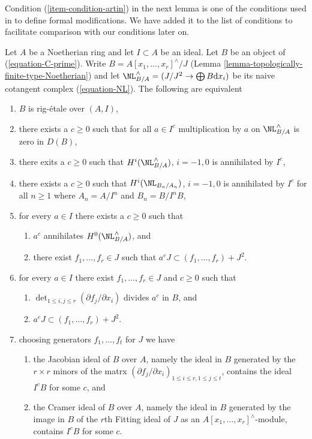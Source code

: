 \noindent
Condition (\ref{item-condition-artin}) in the next lemma is
one of the conditions used in \cite{ArtinII} to define formal modifications.
We have added it to the list of conditions to facilitate comparison
with our conditions later on.

\begin{lemma}
\label{lemma-equivalent-with-artin}
Let $A$ be a Noetherian ring and let $I \subset A$ be an ideal.
Let $B$ be an object of (\ref{equation-C-prime}). Write
$B = A[x_1, \ldots, x_r]^\wedge/J$
(Lemma \ref{lemma-topologically-finite-type-Noetherian})
and let $\NL_{B/A}^\wedge = (J/J^2 \to \bigoplus B\text{d}x_i)$
be its naive cotangent complex (\ref{equation-NL}).
The following are equivalent
\begin{enumerate}
\item $B$ is rig-\'etale over $(A, I)$,
\item
\label{item-zero-on-NL}
there exists a $c \geq 0$ such that for all $a \in I^c$ multiplication by $a$
on $\NL_{B/A}^\wedge$ is zero in $D(B)$,
\item
\label{item-zero-on-cohomology-NL}
there exits a $c \geq 0$ such that $H^i(\NL_{B/A}^\wedge)$, $i = -1, 0$ is
annihilated by $I^c$,
\item
\label{item-zero-on-cohomology-NL-truncations}
there exists a $c \geq 0$ such that $H^i(\NL_{B_n/A_n})$, $i = -1, 0$ is
annihilated by $I^c$ for all $n \geq 1$ where $A_n = A/I^n$ and $B_n = B/I^nB$,
\item
\label{item-condition-artin-pre-pre}
for every $a \in I$ there exists a $c \geq 0$ such that
\begin{enumerate}
\item $a^c$ annihilates $H^0(\NL_{B/A}^\wedge)$, and
\item there exist $f_1, \ldots, f_r \in J$ such that
$a^c J \subset (f_1, \ldots, f_r) + J^2$.
\end{enumerate}
\item
\label{item-condition-artin-pre}
for every $a \in I$ there exist $f_1, \ldots, f_r \in J$ and $c \geq 0$
such that
\begin{enumerate}
\item $\det_{1 \leq i, j \leq r}(\partial f_j/\partial x_i)$ divides
$a^c$ in $B$, and
\item $a^c J \subset (f_1, \ldots, f_r) + J^2$.
\end{enumerate}
\item
\label{item-condition-artin}
choosing generators $f_1, \ldots, f_t$ for $J$ we have
\begin{enumerate}
\item the Jacobian ideal of $B$ over $A$, namely the ideal in $B$
generated by the $r \times r$ minors of the matrx
$(\partial f_j/\partial x_i)_{1 \leq i \leq r, 1 \leq j \leq t}$,
contains the ideal $I^cB$ for some $c$, and
\item the Cramer ideal of $B$ over $A$, namely the ideal in $B$
generated by the image in $B$ of the $r$th Fitting ideal of $J$
as an $A[x_1, \ldots, x_r]^\wedge$-module, contains $I^cB$ for some $c$.
\end{enumerate}
\end{enumerate}
\end{lemma}

